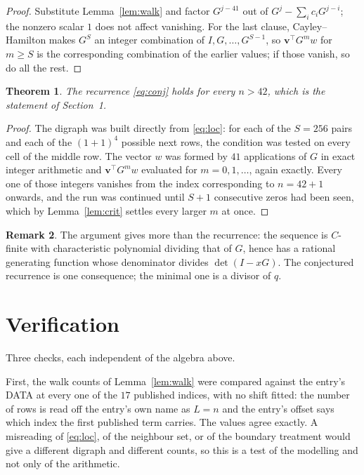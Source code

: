 \documentclass[11pt,a4paper]{article}
\theoremstyle{plain}
\newtheorem{theorem}{Theorem}
\theoremstyle{definition}
\newtheorem{remark}[theorem]{Remark}
\begin{document}
\begin{proof}
Substitute Lemma~\ref{lem:walk} and factor $G^{j-41}$ out of
$G^{j}-\sum_ic_iG^{j-i}$; the nonzero scalar $1$ does not affect
vanishing. For the last clause, Cayley--Hamilton makes $G^{S}$ an integer combination of
$I,G,\dots,G^{S-1}$, so $\mathbf{v}^{\!\top}G^{m}w$ for $m\ge S$ is the corresponding
combination of the earlier values; if those vanish, so do all the rest.
\end{proof}

\begin{theorem}
The recurrence \eqref{eq:conj} holds for every $n>42$, which is the statement of
Section~1.
\end{theorem}

\begin{proof}
The digraph was built directly from \eqref{eq:loc}: for each of the $S=256$ pairs and each
of the $(1+1)^{4}$ possible next rows, the condition was tested on every cell of
the middle row. The vector $w$ was formed by $41$ applications of $G$ in exact integer
arithmetic and $\mathbf{v}^{\!\top}G^{m}w$ evaluated for $m=0,1,\dots$, again exactly.
Every one of those integers vanishes from the index corresponding to $n=42+1$ onwards,
and the run was continued until $S+1$ consecutive zeros had been seen, which by
Lemma~\ref{lem:crit} settles every larger $m$ at once.
\end{proof}

\begin{remark}
The argument gives more than the recurrence: the sequence is $C$-finite with characteristic
polynomial dividing that of $G$, hence has a rational generating function whose denominator
divides $\det(I-xG)$. The conjectured recurrence is one consequence; the minimal one is a
divisor of $q$.
\end{remark}

\section{Verification}

Three checks, each independent of the algebra above.

First, the walk counts of Lemma~\ref{lem:walk} were compared against the entry's DATA at
every one of the $17$ published indices, with no shift fitted: the number of rows is
read off the entry's own name as $L=n$ and the entry's offset says which index the first
published term carries. The values agree exactly. A misreading of \eqref{eq:loc}, of the
neighbour set, or of the boundary treatment would give a different digraph and different
counts, so this is a test of the modelling and not only of the arithmetic.
\end{document}
